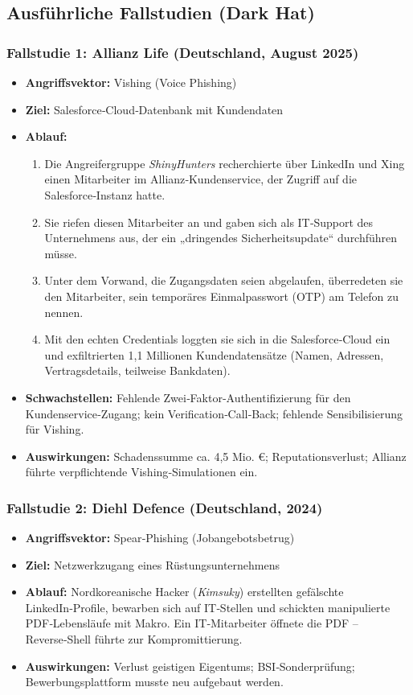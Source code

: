 \documentclass[10pt,a4paper]{article}
\begin{document}
	\subsection{Ausführliche Fallstudien (Dark Hat)}
	
	\subsubsection{Fallstudie 1: Allianz Life (Deutschland, August 2025)}
	\begin{itemize}
		\item \textbf{Angriffsvektor:} Vishing (Voice Phishing)
		\item \textbf{Ziel:} Salesforce‑Cloud‑Datenbank mit Kundendaten
		\item \textbf{Ablauf:}
		\begin{enumerate}
			\item Die Angreifergruppe \textit{ShinyHunters} recherchierte über LinkedIn und Xing einen Mitarbeiter im Allianz‑Kundenservice, der Zugriff auf die Salesforce‑Instanz hatte.
			\item Sie riefen diesen Mitarbeiter an und gaben sich als IT‑Support des Unternehmens aus, der ein „dringendes Sicherheitsupdate“ durchführen müsse.
			\item Unter dem Vorwand, die Zugangsdaten seien abgelaufen, überredeten sie den Mitarbeiter, sein temporäres Einmalpasswort (OTP) am Telefon zu nennen.
			\item Mit den echten Credentials loggten sie sich in die Salesforce‑Cloud ein und exfiltrierten 1,1 Millionen Kundendatensätze (Namen, Adressen, Vertragsdetails, teilweise Bankdaten).
		\end{enumerate}
		\item \textbf{Schwachstellen:} Fehlende Zwei‑Faktor‑Authentifizierung für den Kundenservice‑Zugang; kein Verification‑Call‑Back; fehlende Sensibilisierung für Vishing.
		\item \textbf{Auswirkungen:} Schadenssumme ca. 4,5 Mio. €; Reputationsverlust; Allianz führte verpflichtende Vishing‑Simulationen ein.
	\end{itemize}
	
	\subsubsection{Fallstudie 2: Diehl Defence (Deutschland, 2024)}
	\begin{itemize}
		\item \textbf{Angriffsvektor:} Spear‑Phishing (Jobangebotsbetrug)
		\item \textbf{Ziel:} Netzwerkzugang eines Rüstungsunternehmens
		\item \textbf{Ablauf:} Nordkoreanische Hacker (\textit{Kimsuky}) erstellten gefälschte LinkedIn‑Profile, bewarben sich auf IT‑Stellen und schickten manipulierte PDF‑Lebensläufe mit Makro. Ein IT‑Mitarbeiter öffnete die PDF – Reverse‑Shell führte zur Kompromittierung.
		\item \textbf{Auswirkungen:} Verlust geistigen Eigentums; BSI‑Sonderprüfung; Bewerbungsplattform musste neu aufgebaut werden.
	\end{itemize}
	
\end{document}
